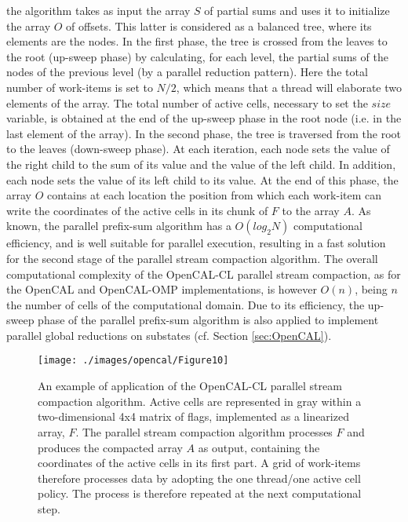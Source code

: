 the algorithm takes as input the array $S$ of partial sums and uses
it to initialize the array $O$ of offsets. This latter is considered
as a balanced tree, where its elements are the nodes. In the first
phase, the tree is crossed from the leaves to the root (up-sweep
phase) by calculating, for each level, the partial sums of the nodes
of the previous level (by a parallel reduction pattern). Here the
total number of work-items is set to $N/2$, which means that a
thread will elaborate two elements of the array. The total number of
active cells, necessary to set the $size$ variable, is obtained at
the end of the up-sweep phase in the root node (i.e. in the last
element of the array). In the second phase, the tree is traversed
from the root to the leaves (down-sweep phase). At each iteration,
each node sets the value of the right child to the sum of its value
and the value of the left child. In addition, each node sets the
value of its left child to its value. At the end of this phase, the
array $O$ contains at each location the position from which each
work-item can write the coordinates of the active cells in its chunk
of $F$ to the array $A$. As known, the parallel prefix-sum algorithm
has a $O(log_2 N)$ computational efficiency, and is well suitable
for parallel execution, resulting in a fast solution for the second
stage of the parallel stream compaction algorithm. The overall
computational complexity of the OpenCAL-CL parallel stream
compaction, as for the OpenCAL and OpenCAL-OMP implementations, is
however $O(n)$, being $n$ the number of cells of the computational
domain. Due to its efficiency, the up-sweep phase of the parallel
prefix-sum algorithm is also applied to implement parallel global
reductions on substates (cf. Section \ref{sec:OpenCAL}).
\begin{figure}
	\begin{center}
		\texttt{[image: ./images/opencal/Figure10]}
		\caption[\texttt{OpenCL} stream compaction algorithm adopted in \texttt{OpenCAL}.]{An example of application of the OpenCAL-CL parallel stream compaction algorithm. Active cells are represented in gray within a
			two-dimensional 4x4 matrix of flags, implemented as a linearized
			array, $F$. The parallel stream compaction algorithm processes $F$ and produces the compacted array $A$ as output, containing the coordinates of the active cells in its first part. A grid of work-items therefore processes data by adopting the one thread/one active cell policy. The process is therefore repeated at the next computational step.}
		\label{fig:streamcompaction}
	\end{center}
\end{figure}


